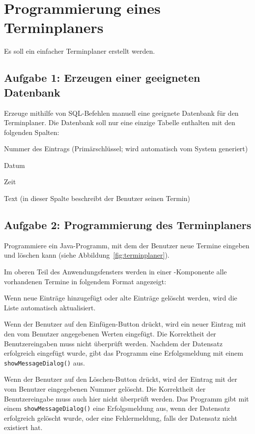 \section{Programmierung eines Terminplaners}

Es soll ein einfacher Terminplaner erstellt werden.

\subsection{Aufgabe 1: Erzeugen einer geeigneten Datenbank}

Erzeuge mithilfe von SQL-Befehlen manuell eine geeignete Datenbank für den
Terminplaner. Die Datenbank soll nur eine einzige Tabelle enthalten mit den
folgenden Spalten:

\begin{compactitem}
\item Nummer des Eintrags (Primärschlüssel; wird automatisch vom System
generiert)
\item Datum
\item Zeit
\item Text (in dieser Spalte beschreibt der Benutzer seinen Termin)
\end{compactitem}


\subsection{Aufgabe 2: Programmierung des Terminplaners}

Programmiere ein Java-Programm, mit dem der Benutzer neue Termine eingeben und
löschen kann (siehe Abbildung~\ref{fig:terminplaner}).

Im oberen Teil des Anwendungsfensters werden in einer
-Komponente alle vorhandenen Termine in folgendem Format angezeigt:


Wenn neue Einträge hinzugefügt oder alte Einträge gelöscht werden, wird
die Liste automatisch aktualisiert.

Wenn der Benutzer auf den \glqq Einfügen\grqq -Button drückt, wird ein neuer Eintrag mit
den vom Benutzer angegebenen Werten eingefügt. Die Korrektheit der
Benutzereingaben muss nicht überprüft werden.
Nachdem der Datensatz erfolgreich eingefügt wurde, gibt das Programm eine
Erfolgsmeldung mit einem \lstinline|showMessageDialog()| aus.

Wenn der Benutzer auf den \glqq Löschen\grqq -Button drückt, wird der Eintrag mit der vom
Benutzer eingegebenen Nummer gelöscht. Die Korrektheit der Benutzereingabe muss
auch hier nicht überprüft werden. Das Programm gibt mit einem
\lstinline|showMessageDialog()| eine Erfolgsmeldung aus, wenn der Datensatz
erfolgreich gelöscht wurde, oder eine Fehlermeldung, falls der Datensatz nicht
existiert hat.

